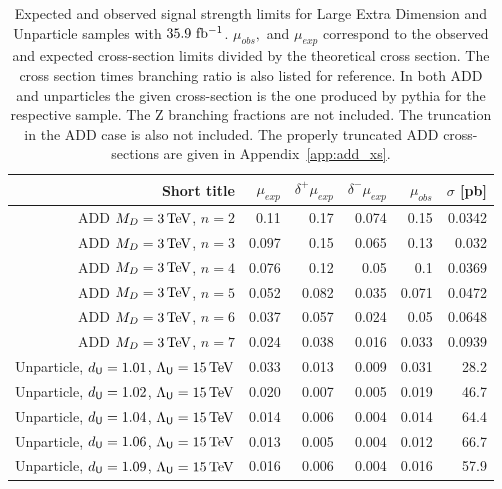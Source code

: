 \begin{table}[hbtp]
  \caption{
    Expected and observed signal strength limits for Large Extra Dimension and Unparticle samples with $35.9~\mathrm{fb^{-1}}$.
    $\mu_{obs},$ and $\mu_{exp}$ correspond to the observed and expected cross-section limits divided by the theoretical cross section.
    The cross section times branching ratio is also listed for reference.
    In both ADD and unparticles the given cross-section is the one produced by pythia for the respective sample.
    The Z branching fractions are not included. The truncation in the ADD case is also not included.
    The properly truncated ADD cross-sections are given in Appendix~\ref{app:add_xs}.
  }
  \label{tab:addunpart_limits}
  \begin{center}
{\footnotesize
  \begin{tabular}{rrrrrr}
\hline 
Short title               & $\mu_{exp}$  & $\delta^{+}\mu_{exp}$ & $\delta^{-}\mu_{exp}$ & $\mu_{obs}$  & $\sigma$ [pb]\\
\hline
ADD $M_{D} = 3\,\text{Te\hspace{-.08em}V}$, $n=2$               & 0.11         & 0.17         & 0.074        & 0.15         & 0.0342          \\
ADD $M_{D} = 3\,\text{Te\hspace{-.08em}V}$, $n=3$               & 0.097        & 0.15         & 0.065        & 0.13         & 0.032           \\
ADD $M_{D} = 3\,\text{Te\hspace{-.08em}V}$, $n=4$               & 0.076        & 0.12         & 0.05         & 0.1          & 0.0369          \\
ADD $M_{D} = 3\,\text{Te\hspace{-.08em}V}$, $n=5$               & 0.052        & 0.082        & 0.035        & 0.071        & 0.0472          \\
ADD $M_{D} = 3\,\text{Te\hspace{-.08em}V}$, $n=6$               & 0.037        & 0.057        & 0.024        & 0.05         & 0.0648          \\
ADD $M_{D} = 3\,\text{Te\hspace{-.08em}V}$, $n=7$               & 0.024        & 0.038        & 0.016        & 0.033        & 0.0939          \\
Unparticle, $d_{\textsf{U}}=1.01$, $\Lambda_{\textsf{U}}=15\,\text{Te\hspace{-.08em}V}$ &   0.033 &    0.013 &    0.009 &    0.031 & 28.2 \\
Unparticle, $d_{\textsf{U}}=1.02$, $\Lambda_{\textsf{U}}=15\,\text{Te\hspace{-.08em}V}$ &   0.020 &    0.007 &    0.005 &    0.019 & 46.7 \\
Unparticle, $d_{\textsf{U}}=1.04$, $\Lambda_{\textsf{U}}=15\,\text{Te\hspace{-.08em}V}$ &   0.014 &    0.006 &    0.004 &    0.014 & 64.4 \\
Unparticle, $d_{\textsf{U}}=1.06$, $\Lambda_{\textsf{U}}=15\,\text{Te\hspace{-.08em}V}$ &   0.013 &    0.005 &    0.004 &    0.012 & 66.7 \\
Unparticle, $d_{\textsf{U}}=1.09$, $\Lambda_{\textsf{U}}=15\,\text{Te\hspace{-.08em}V}$ &   0.016 &    0.006 &    0.004 &    0.016 & 57.9 \\

\end{tabular}}
\end{center}
\end{table}
